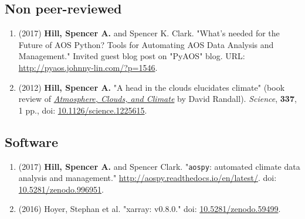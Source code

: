 \documentclass[12pt,letterpaper]{shillcv}
\begin{document}
\subsection*{Non peer-reviewed}
\label{sec:orgeeb5db6}
\begin{enumerate}
\item (2017) \textbf{Hill, Spencer A.} and Spencer K. Clark.  "What’s needed for the Future
of AOS Python? Tools for Automating AOS Data Analysis and Management."
Invited guest blog post on "PyAOS" blog.  URL:
\url{http://pyaos.johnny-lin.com/?p=1546}.
\item (2012) \textbf{Hill, Spencer A.}  "A head in the clouds elucidates climate" (book
review of \href{http://press.princeton.edu/titles/9773.html}{\emph{Atmosphere, Clouds, and Climate}} by David Randall). \emph{Science}, \textbf{337},
1 pp., doi: \href{http://dx.doi.org/10.1126/science.1225615}{10.1126/science.1225615}.
\end{enumerate}
\subsection*{Software}
\label{sec:org7899a03}
\begin{enumerate}
\item (2017) \textbf{Hill, Spencer A.} and Spencer Clark.  "\texttt{aospy}: automated climate data
analysis and management."  \url{http://aospy.readthedocs.io/en/latest/}.  doi:
\href{https://doi.org/10.5281/zenodo.996951}{10.5281/zenodo.996951}.
\item (2016) Hoyer, Stephan et al.  "xarray: v0.8.0."  doi: \href{https://doi.org/10.5281/zenodo.59499}{10.5281/zenodo.59499}.
\end{enumerate}
\end{document}
